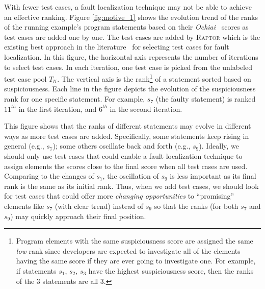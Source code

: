 With fewer test cases, a fault localization technique may not be able to achieve an effective ranking. Figure \ref{fig:motive_1} shows the evolution trend of the ranks of the running example's program statements based on their {\em Ochiai}~\citep{Abreu:2009.jss} scores as test cases are added one by one. The test cases are added by \textsc{Raptor} which is the existing best approach in the literature~\citep{Alberto2011} for selecting test cases for fault localization. In this figure, the horizontal axis represents the number of iterations to select test cases. In each iteration, one test case is picked from the unlabeled test case pool $T_\mathcal{U}$.
The vertical axis is the rank\footnote{\scriptsize Program elements with the same suspiciousness score are assigned the same {\em low} rank since developers are expected to investigate all of the elements having the same score if they are ever going to investigate one. For example, if statements $s_{1}$, $s_{2}$, $s_{3}$ have the highest suspiciousness score, then the ranks of the 3 statements are all 3.}
of a statement sorted based on suspiciousness. Each line in the figure depicts the evolution of the suspiciousness rank for one specific statement. For example, $s_{7}$ (the faulty statement) is ranked $11^{th}$ in the first iteration, and $6^{th}$ in the second iteration.

This figure shows that the ranks of different statements may evolve in different ways as more test cases are added. Specifically, some statements keep rising in general (e.g., $s_{7}$); some others oscillate back and forth (e.g., $s_{9}$).
Ideally, we should only use test cases that could enable a fault localization technique to assign elements the scores close to the final score when all test cases are used.
Comparing to the changes of $s_{7}$, the oscillation of $s_{9}$ is less important as its final rank is the same as its initial rank.
Thus, when we add test cases, we should look for test cases that could offer more {\em changing opportunities} to ``promising'' elements like $s_{7}$ (with clear trend) instead of $s_{9}$ so that the ranks (for both $s_{7}$ and $s_{9}$) may quickly approach their final position.


